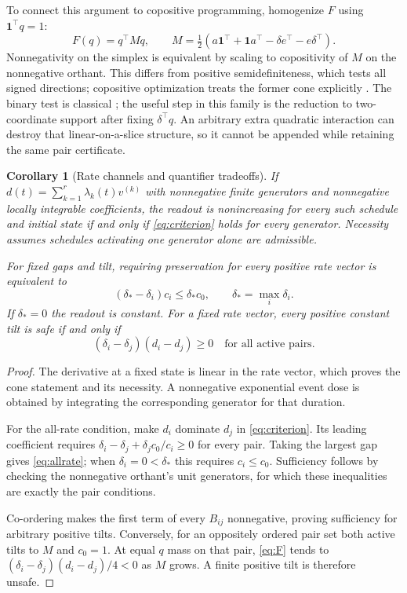 \documentclass[pdflatex,sn-vancouver-num]{sn-jnl}
\theoremstyle{thmstyleone}
\newtheorem{corollary}[theorem]{Corollary}
\begin{document}
To connect this argument to copositive programming, homogenize $F$ using $\mathbf1^\top q=1$:
\begin{equation}\label{eq:copositive-matrix}
F(q)=q^\top Mq,\qquad
M=\tfrac12(a\mathbf1^\top+\mathbf1a^\top
-\delta e^\top-e\delta^\top).
\end{equation}
Nonnegativity on the simplex is equivalent by scaling to copositivity of $M$ on the nonnegative orthant. This differs from positive semidefiniteness, which tests all signed directions; copositive optimization treats the former cone explicitly \cite{dur}. The binary test is classical \cite{copositive}; the useful step in this family is the reduction to two-coordinate support after fixing $\delta^\top q$. An arbitrary extra quadratic interaction can destroy that linear-on-a-slice structure, so it cannot be appended while retaining the same pair certificate.

\begin{corollary}[Rate channels and quantifier tradeoffs]\label{cor:cone}
If $d(t)=\sum_{k=1}^r\lambda_k(t)v^{(k)}$ with nonnegative finite generators and nonnegative locally integrable coefficients, the readout is nonincreasing for every such schedule and initial state if and only if \eqref{eq:criterion} holds for every generator. Necessity assumes schedules activating one generator alone are admissible.

For fixed gaps and tilt, requiring preservation for every positive rate vector is equivalent to
\begin{equation}\label{eq:allrate}
(\delta_*-\delta_i)c_i\le\delta_*c_0,\qquad
\delta_*=\max_i\delta_i.
\end{equation}
If $\delta_*=0$ the readout is constant. For a fixed rate vector, every positive constant tilt is safe if and only if
\begin{equation}\label{eq:coorder}
(\delta_i-\delta_j)(d_i-d_j)\ge0
\quad\text{for all active pairs}.
\end{equation}
\end{corollary}
\begin{proof}
The derivative at a fixed state is linear in the rate vector, which proves the cone statement and its necessity. A nonnegative exponential event dose is obtained by integrating the corresponding generator for that duration.

For the all-rate condition, make $d_i$ dominate $d_j$ in \eqref{eq:criterion}. Its leading coefficient requires
$\delta_i-\delta_j+\delta_jc_0/c_i\ge0$ for every pair. Taking the largest gap gives \eqref{eq:allrate}; when $\delta_i=0<\delta_*$ this requires $c_i\le c_0$. Sufficiency follows by checking the nonnegative orthant's unit generators, for which these inequalities are exactly the pair conditions.

Co-ordering makes the first term of every $B_{ij}$ nonnegative, proving sufficiency for arbitrary positive tilts. Conversely, for an oppositely ordered pair set both active tilts to $M$ and $c_0=1$. At equal $q$ mass on that pair, \eqref{eq:F} tends to $(\delta_i-\delta_j)(d_i-d_j)/4<0$ as $M$ grows. A finite positive tilt is therefore unsafe.
\end{proof}
\end{document}
